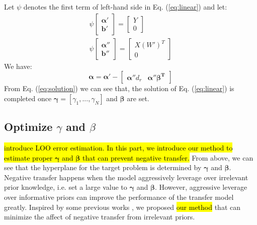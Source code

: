 Let $\psi$ denotes the first term of left-hand side in Eq. (\ref{eq:linear}) and let:
\begin{equation}
\begin{array}{c}
 {\psi}\left[ {\begin{array}{*{20}{c}}
{\boldsymbol{\alpha} '}\\
{\boldsymbol{b}'}
\end{array}} \right] = \left[ {\begin{array}{*{20}{c}}
Y\\
0
\end{array}} \right]\\
{\psi}\left[ {\begin{array}{*{20}{c}}
{\boldsymbol{\alpha} ''}\\
{\boldsymbol{b}''}
\end{array}} \right] = \left[ {\begin{array}{*{20}{c}}
{X{{\left( {W'} \right)}^T}}\\
0
\end{array}} \right]
\end{array}
\end{equation}
We have:
\begin{equation}\label{eq:solution}
 \boldsymbol{\alpha}  = \boldsymbol{\alpha} ' - \left[ {\begin{array}{*{20}{c}}
 {\boldsymbol{\alpha} ''{d_r}}&{{\boldsymbol{\alpha} ''\boldsymbol{\beta ^T}}}
 \end{array}} \right]
\end{equation}
From Eq. (\ref{eq:solution}) we can see that, the solution of Eq. (\ref{eq:linear}) is completed once $\boldsymbol{\gamma}=\left[ \gamma_1,...,\gamma_N\right] $ and $\boldsymbol{\beta}$ are set.

\subsection{Optimize $\gamma$ and $\beta$}
\hl{introduce LOO error estimation. In this part, we introduce our method to estimate proper $\boldsymbol{\gamma}$ and $\boldsymbol{\beta}$ that can prevent negative transfer.}
From above, we can see that the hyperplane for the target problem is determined by $\boldsymbol{\gamma}$ and $\boldsymbol{\beta}$. Negative transfer happens when the model aggressively leverage over irrelevant prior knowledge, i.e. set a  large value to $\boldsymbol{\gamma}$ and $\boldsymbol{\beta}$. However, aggressive leverage over informative priors can improve the performance of the transfer model greatly. Inspired by some previous works \cite{tommasi2014learning} \cite{kuzborskij2013n}, we proposed \hl{our method} that can minimize the affect of negative transfer from irrelevant priors.

